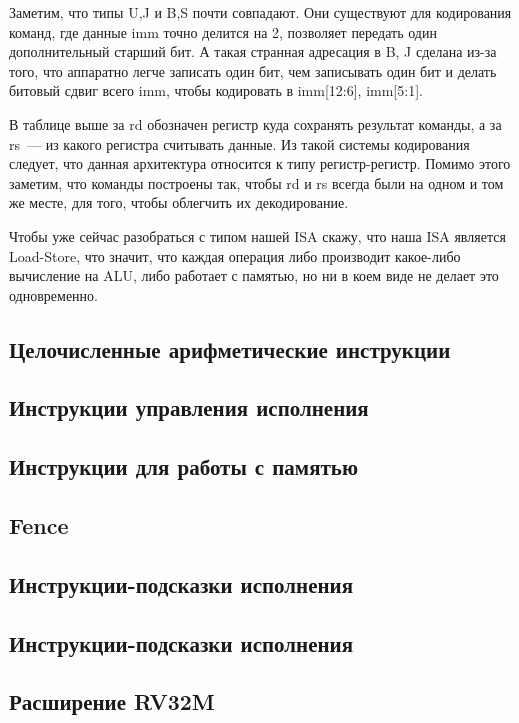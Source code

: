\documentclass[14pt, russian, onesize]{extreport}
\begin{document}
Заметим, что типы U,J и B,S почти совпадают. Они существуют для кодирования
команд, где данные imm точно делится на 2, позволяет передать один
дополнительный старший бит. А такая странная адресация в B, J сделана
из-за того, что аппаратно легче записать один бит, чем записывать
один бит и делать битовый сдвиг всего imm, чтобы кодировать в imm[12:6], imm[5:1].

В таблице выше за rd обозначен регистр
куда сохранять результат команды, а за rs~--- из какого регистра считывать данные.
Из такой системы  кодирования следует,
что данная архитектура относится к типу регистр-регистр. 
Помимо этого заметим, что команды построены так, чтобы rd и rs всегда
были на одном и том же месте, для того, чтобы облегчить их декодирование.

Чтобы уже сейчас разобраться с типом нашей ISA скажу, что наша ISA 
является Load-Store, что значит, что каждая операция либо производит
какое-либо вычисление на ALU, либо работает с памятью, но ни в коем
виде не делает это одновременно.

\subsection*{Целочисленные арифметические инструкции}

\subsection*{Инструкции управления исполнения}

\subsection*{Инструкции для работы с памятью}

\subsection*{Fence}

\subsection*{Инструкции-подсказки исполнения}

\subsection*{Инструкции-подсказки исполнения}

\subsection*{Расширение RV32M}
\end{document}
